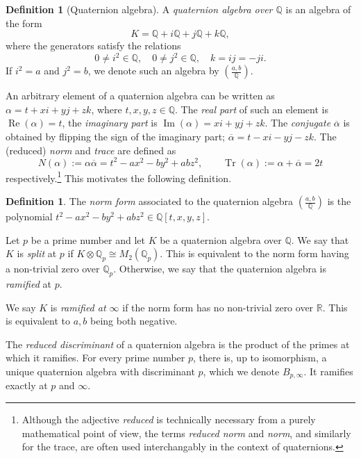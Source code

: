 \documentclass[10pt]{article}
\theoremstyle{plain}
\theoremstyle{definition}
\newtheorem{definition}[theorem]{Definition}
\DeclareMathOperator{\Tr}{Tr} %
\DeclareMathOperator{\im}{Im} %
\DeclareMathOperator{\re}{Re} %
\def\Q{\ensuremath{\mathbb{Q}}}
\begin{document}
\begin{definition}[Quaternion algebra]
  A \emph{quaternion algebra over $\Q$} is an algebra of the form
  \[K = ℚ + iℚ + jℚ + kℚ,\]
  where the generators satisfy the relations
  \[0\neq i^2\in\Q, \quad 0\neq j^2∈ℚ, \quad k=ij=-ji.\]
  If $i^2 = a$ and $j^2 = b$, we denote such an algebra by
  $\left(\frac{a,b}{\Q}\right)$.
\end{definition}

An arbitrary element of a quaternion algebra can be written as
$\alpha = t + xi  + yj + zk$, where $t,x,y,z\in\Q$.
The \emph{real part}  of such an element is $\re(\alpha) = t$,
the \emph{imaginary part} is $\im(\alpha) = xi + yj + zk$.
The \emph{conjugate} $\overline{\alpha}$ is obtained
by flipping the sign of the imaginary part;
$\overline{\alpha} = t - xi - yj - zk$.
The (reduced) \emph{norm} and \emph{trace} are defined as
\begin{equation*}
N(\alpha) := \alpha\overline{\alpha} = t^2 - ax^2 - by^2 +abz^2, \qquad
\Tr(\alpha) := \alpha + \overline{\alpha} = 2t
\end{equation*}
respectively.\footnote{Although the adjective \emph{reduced} is technically
necessary from a purely mathematical point of view, the terms
\emph{reduced norm} and \emph{norm}, and similarly for the trace,
are often used interchangably in the context of quaternions.}
This motivates the following definition.

\begin{definition}
The \emph{norm form} associated to the quaternion algebra $\left(\frac{a,b}{\Q}\right)$ is the polynomial $t^2 - ax^2 - by^2 + abz^2\in\Q[t,x,y,z]$. 
\end{definition}

Let $p$ be a prime number and let $K$ be a quaternion algebra over $\Q$.
We say that $K$ is \emph{split} at $p$ if $K\otimes\Q_p\cong M_2(\Q_p)$.
This is equivalent to the norm form having a non-trivial zero over $\Q_p$.
Otherwise, we say that the quaternion algebra is \emph{ramified} at $p$.

We say $K$ is \emph{ramified at $\infty$}
if the norm form has no non-trivial zero over $\mathbb{R}$.
This is equivalent to $a,b$ being both negative.

The \emph{reduced discriminant} of a quaternion algebra
is the product of the primes at which it ramifies.
For every prime number $p$, there is, up to isomorphism,
a unique quaternion algebra with discriminant $p$, which we denote
$B_{p,\infty}$. It ramifies exactly at $p$ and $\infty$.
\end{document}
